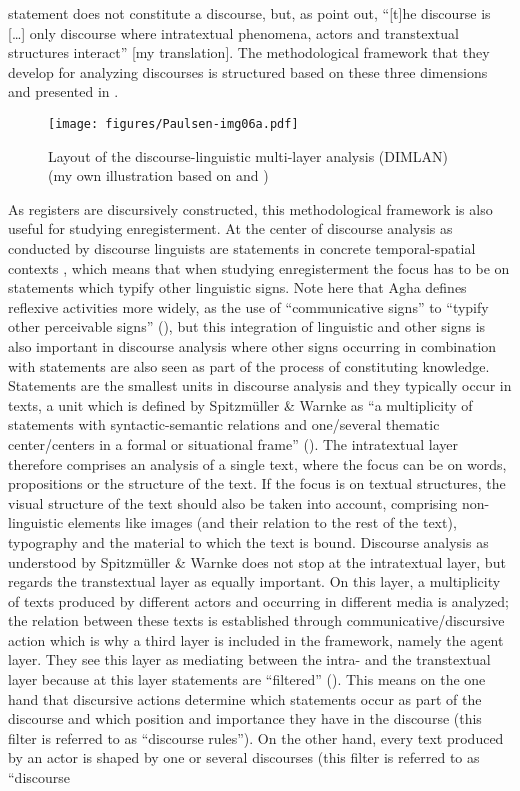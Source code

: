 statement does not constitute a discourse, but, as \citet[187]{Spitzmuller2011} point out, “[t]he discourse is […] only discourse where intratextual phenomena, actors and transtextual structures interact” [my translation]. The methodological framework that they develop for analyzing discourses is structured based on these three dimensions and presented in .

\begin{figure}
\texttt{[image: figures/Paulsen-img06a.pdf]}
\caption{
\label{bkm:Ref522891320}Layout of the discourse-linguistic multi-layer analysis (DIMLAN) (my own illustration based on \citealt[201]{Spitzmuller2011} and \citealt{Spitzmuller2014})
}
\label{fig:2:6a}
\end{figure}


As registers are discursively constructed, this methodological framework is also useful for studying enregisterment. At the center of discourse analysis as conducted by discourse linguists are statements in concrete temporal-spatial contexts \citep[123]{Spitzmuller2011}, which means that when studying enregisterment the focus has to be on statements which typify other linguistic signs. Note here that Agha defines reflexive activities more widely, as the use of “communicative signs” to “typify other perceivable signs” (\citeyear[16]{Agha2007}), but this integration of linguistic and other signs is also important in discourse analysis where other signs occurring in combination with statements are also seen as part of the process of constituting knowledge. Statements are the smallest units in discourse analysis and they typically occur in texts, a unit which is defined by Spitzmüller \& Warnke as “a multiplicity of statements with syntactic-semantic relations and one/several thematic center/centers in a formal or situational frame” (\citeyear[137]{Spitzmuller2011}). The intratextual layer therefore comprises an analysis of a single text, where the focus can be on words, propositions or the structure of the text. If the focus is on textual structures, the visual structure of the text should also be taken into account, comprising non-linguistic elements like images (and their relation to the rest of the text), typography and the material to which the text is bound. Discourse analysis as understood by Spitzmüller \& Warnke does not stop at the intratextual layer, but regards the transtextual layer as equally important. On this layer, a multiplicity of texts produced by different actors and occurring in different media is analyzed; the relation between these texts is established through communicative/discursive action which is why a third layer is included in the framework, namely the agent layer. They see this layer as mediating between the intra- and the transtextual layer because at this layer statements are “filtered” (\citeyear[173--174]{Spitzmuller2011}). This means on the one hand that discursive actions determine which statements occur as part of the discourse and which position and importance they have in the discourse (this filter is referred to as “discourse rules”). On the other hand, every text produced by an actor is shaped by one or several discourses (this filter is referred to as “discourse 